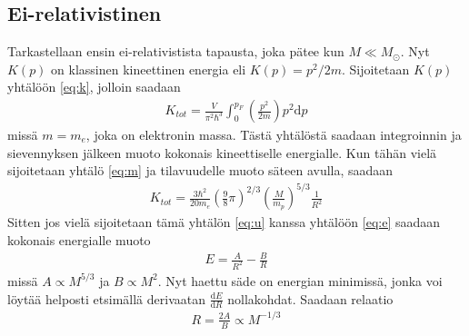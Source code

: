 \documentclass[12pt,a4paper,titlepage]{article}
\begin{document}
\subsection{Ei-relativistinen}
Tarkastellaan ensin ei-relativistista tapausta, joka pätee kun $M \ll M_{\odot}$. Nyt $K(p)$ on klassinen kineettinen energia eli $K(p) = p^2/2 m$. Sijoitetaan $K(p)$ yhtälöön \eqref{eq:k}, jolloin saadaan
\begin{align}
K_{tot} = \frac{V}{\pi^2 \hbar^3} \int_0^{p_F} \left(\frac{p^2}{2 m}\right) p^2 \mathrm{d}p 
\end{align}
missä $m = m_e$, joka on elektronin massa. Tästä yhtälöstä saadaan integroinnin ja sievennyksen jälkeen muoto kokonais kineettiselle energialle. Kun tähän vielä sijoitetaan yhtälö \eqref{eq:m} ja tilavuudelle muoto säteen avulla, saadaan
\begin{align}
K_{tot} = \frac{3 \hbar^2}{20 m_e} \left( \frac{9}{8} \pi \right)^{2/3} \left(\frac{M}{m_p} \right)^{5/3} \frac{1}{R^2}
\end{align}
Sitten jos vielä sijoitetaan tämä yhtälön \eqref{eq:u} kanssa yhtälöön \eqref{eq:e} saadaan kokonais energialle muoto
\begin{align}
E = \frac{A}{R^2} - \frac{B}{R} 
\end{align}
missä $A \propto M^{5/3}$ ja $B \propto M^2$. Nyt haettu säde on energian minimissä, jonka voi löytää helposti etsimällä derivaatan $\frac{\mathrm{d}E}{\mathrm{d}R}$ nollakohdat. Saadaan relaatio
\begin{align}
R = \frac{2 A}{B} \propto M^{-1/3} \label{eq:eirela}
\end{align}
\end{document}
